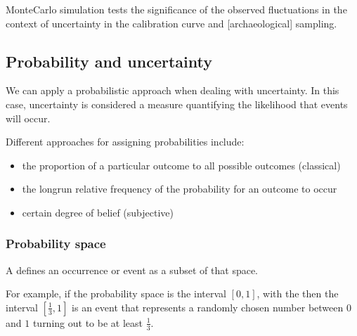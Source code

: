 \documentclass[a4paper,12pt,english]{sphinxhowto}
\begin{document}

Monte\sphinxhyphen{}Carlo simulation tests the significance of the observed fluctuations in the context
of uncertainty in the calibration curve and {[}archaeological{]} sampling.



\subsection{Probability and uncertainty}
\label{\detokenize{Uncertainty:probability-and-uncertainty}}
We can apply a probabilistic approach when dealing with uncertainty.
In this case, uncertainty is considered a measure quantifying the likelihood that events will occur.

Different approaches for assigning probabilities include:
\begin{itemize}
\item {} 
the proportion of a particular outcome to all possible outcomes (classical)

\item {} 
the long\sphinxhyphen{}run relative frequency of the probability for an outcome to occur

\item {} 
certain degree of belief (subjective)

\end{itemize}



\subsubsection{Probability space}
\label{\detokenize{Uncertainty:probability-space}}
A  defines an occurrence or event as a subset of that space.

For example, if the probability space is the interval \([0,1]\), with the {\hyperref[\detokenize{Uncertainty:unif}]{}} then the interval
\([ \frac{1}{3}, 1 ]\) is an event that represents a randomly chosen number between \(0\) and \(1\)
turning out to be at least \(\frac{1}{3}\).
\end{document}
